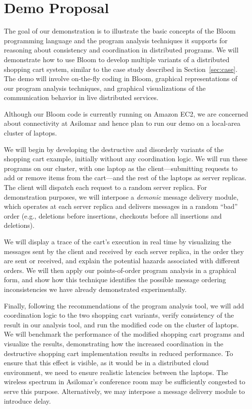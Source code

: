 \clearpage
\section{Demo Proposal}
\label{sec:demo}

The goal of our demonstration
is to illustrate the basic concepts of the Bloom programming language and the
program analysis techniques it supports for reasoning about consistency and
coordination in distributed programs.  We will demonstrate how to use Bloom to
develop multiple variants of a distributed shopping cart system, similar to the
case study described in Section~\ref{sec:case}.  The demo will involve
on-the-fly coding in Bloom, graphical representations of our program analysis
techniques, and graphical visualizations of the communication behavior in live
distributed services.

Although our Bloom code is currently running on Amazon EC2, we are concerned
about connectivity at Asilomar and hence plan to run our demo on a local-area
cluster of laptops.

We will begin by developing the destructive and disorderly variants of the
shopping cart example, initially without any coordination logic. We will run
these programs on our cluster, with one laptop as the client---submitting
requests to add or remove items from the cart---and the rest of the laptops as
server replicas.  The client will dispatch each request to a random server
replica.  For demonstration purposes, we will interpose a \emph{demonic}
message delivery module, which operates at each server replica and delivers
messages in a random ``bad'' order (e.g., deletions before insertions,
checkouts before all insertions and deletions).

We will display a trace of the cart's execution in real time by visualizing the
messages sent by the client and received by each server replica, in the order
they are sent or received, and explain the potential hazards associated with
different orders. We will then apply our points-of-order program analysis in a
graphical form, and show how this technique identifies the possible message
ordering inconsistencies we have already demonstrated experimentally.

Finally, following the recommendations of the program analysis tool, we will
add coordination logic to the two shopping cart variants, verify consistency of
the result in our analysis tool, and run the modified code on the cluster of
laptops. We will benchmark the performance of the modified shopping cart
programs and visualize the results, demonstrating how the increased
coordination in the destructive shopping cart implementation results in reduced
performance. To ensure that this effect is visible, as it would be in a
distributed cloud environment, we need to ensure realistic latencies between
the laptops.  The wireless spectrum in Asilomar's conference room may be
sufficiently congested to serve this purpose.  Alternatively, we may interpose
a message delivery module to introduce delay.

